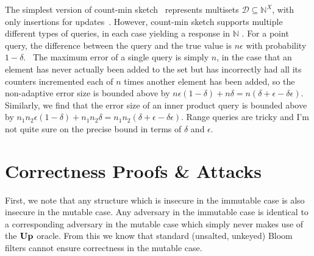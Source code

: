 \documentclass[11pt, pdftex]{article}
\newcommand{\UPO}{\oraclefont{Up}}
\begin{document}
The simplest version of count-min sketch~\cite{xxx} represents multisets $\mathcal{D} \subseteq \mathbb{N}^X$, with only insertions for updates~. However, count-min sketch supports multiple different types of queries, in each case yielding a response in $\mathbb{N}$ . For a point query, the difference between the query and the true value is $n\epsilon$ with probability $1-\delta$.~ The maximum error of a single query is simply $n$, in the case that an element has never actually been added to the set but has incorrectly had all its counters incremented each of $n$ times another element has been added, so the non-adaptive  error size is bounded above by $n\epsilon(1-\delta)+n\delta = n(\delta+\epsilon-\delta\epsilon)$.  Similarly, we find that the error size of an inner product query is bounded above by $n_1n_2\epsilon(1-\delta)+n_1n_2\delta = n_1n_2(\delta+\epsilon-\delta\epsilon)$. Range queries are tricky and I'm not quite sure on the precise bound in terms of $\delta$ and $\epsilon$.

\section{Correctness Proofs \& Attacks}

First, we note that any structure which is insecure in the immutable case is also insecure in the mutable case. Any adversary in the immutable case is identical to a corresponding adversary in the mutable case which simply never makes use of the $\UPO$ oracle. From this we know that standard (unsalted, unkeyed) Bloom filters cannot ensure correctness in the mutable case.
\end{document}

